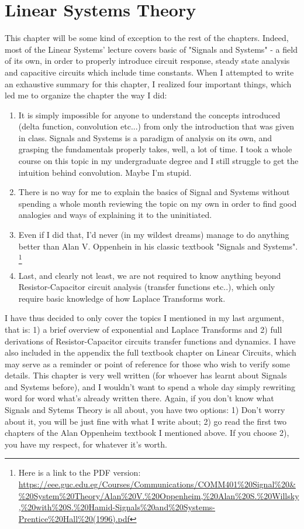 \newpage
\section{Linear Systems Theory}

This chapter will be some kind of exception to the rest of the chapters. Indeed, most of the Linear Systems' lecture covers basic of "Signals and Systems" - a field of its own, in order to properly introduce circuit response, steady state analysis and capacitive circuits which include time constants. When I attempted to write an exhaustive summary for this chapter, I realized four important things, which led me to organize the chapter the way I did: 

\begin{enumerate}
    \item It is simply impossible for anyone to understand the concepts introduced (delta function, convolution etc...) from only the introduction that was given in class. Signals and Systems is a paradigm of analysis on its own, and grasping the fundamentals properly takes, well, a lot of time. I took a whole course on this topic in my undergraduate degree and I still struggle to get the intuition behind convolution. Maybe I'm stupid. 
    \item There is no way for me to explain the basics of Signal and Systems without spending a whole month reviewing the topic on my own in order to find good analogies and ways of explaining it to the uninitiated. 
    \item Even if I did that, I'd never (in my wildest dreams) manage to do anything better than Alan V. Oppenhein in his classic textbook "Signals and Systems". \footnote{Here is a link to the PDF version: \url{https://eee.guc.edu.eg/Courses/Communications/COMM401\%20Signal\%20&\%20System\%20Theory/Alan\%20V.\%20Oppenheim,\%20Alan\%20S.\%20Willsky,\%20with\%20S.\%20Hamid-Signals\%20and\%20Systems-Prentice\%20Hall\%20(1996).pdf}}
    \item Last, and clearly not least, we are not required to know anything beyond Resistor-Capacitor circuit analysis (transfer functions etc..), which only require basic knowledge of how Laplace Transforms work.
\end{enumerate}

I have thus decided to only cover the topics I mentioned in my last argument, that is: 1) a brief overview of exponential and Laplace Transforms and 2) full derivations of Resistor-Capacitor circuits transfer functions and dynamics. I have also included in the appendix the full textbook chapter on Linear Circuits, which may serve as a reminder or point of reference for those who wish to verify some details. This chapter is very well written (for whoever has learnt about Signals and Systems before), and I wouldn't want to spend a whole day simply rewriting word for word what's already written there. Again, if you don't know what Signals and Sytems Theory is all about, you have two options: 1) Don't worry about it, you will be just fine with what I write about; 2) go read the first two chapters of the Alan Oppenheim textbook I mentioned above. If you choose 2), you have my respect, for whatever it's worth.   

